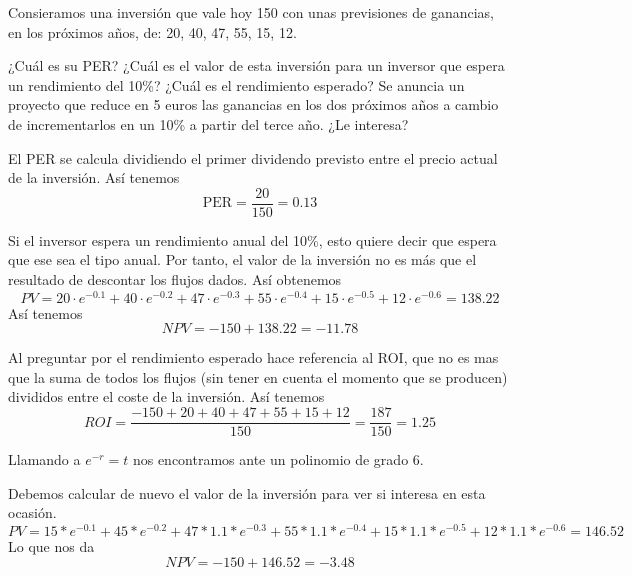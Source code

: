 \begin{problem}[9]
Consieramos una inversión que vale hoy 150 con unas previsiones de ganancias, en los próximos años, de: 20, 40, 47, 55, 15, 12.

\ppart ¿Cuál es su PER?
\ppart ¿Cuál es el valor de esta inversión para un inversor que espera un rendimiento del 10\%?
\ppart ¿Cuál es el rendimiento esperado?
\ppart Se anuncia un proyecto que reduce en 5 euros las ganancias en los dos próximos años a cambio de incrementarlos en un 10\% a partir del terce año. ¿Le interesa?
\solution

\spart

El PER se calcula dividiendo el primer dividendo previsto entre el precio actual de la inversión. Así tenemos
\[\text{PER} = \frac{20}{150} = 0.13\]

\spart

Si el inversor espera un rendimiento anual del 10\%, esto quiere decir que espera que ese sea el tipo anual. Por tanto, el valor de la inversión no es más que el resultado de descontar los flujos dados. Así obtenemos
\[PV = 20\cdot e^{-0.1} + 40 \cdot e^{-0.2} + 47 \cdot e^{-0.3} + 55 \cdot e^{-0.4} + 15 \cdot e^{-0.5} + 12 \cdot e^{-0.6} = 138.22\]
Así tenemos
\[NPV = -150 + 138.22 = -11.78\]

\spart

Al preguntar por el rendimiento esperado hace referencia al ROI, que no es mas que la suma de todos los flujos (sin tener en cuenta el momento que se producen) divididos entre el coste de la inversión. Así tenemos
\[ROI = \frac{-150+20+40+47+55+15+12}{150} = \frac{187}{150} = 1.25\]

Llamando a $e^{-r}=t$ nos encontramos ante un polinomio de grado 6.

\spart

Debemos calcular de nuevo el valor de la inversión para ver si interesa en esta ocasión.
\[PV = 15* e^{-0.1} + 45 * e^{-0.2} + 47* 1.1 * e^{-0.3} + 55 * 1.1 * e^{-0.4} + 15 * 1.1* e^{-0.5} + 12 * 1.1 * e^{-0.6} = 146.52\]
Lo que nos da
\[NPV = -150 + 146.52=-3.48\]
\end{problem}

